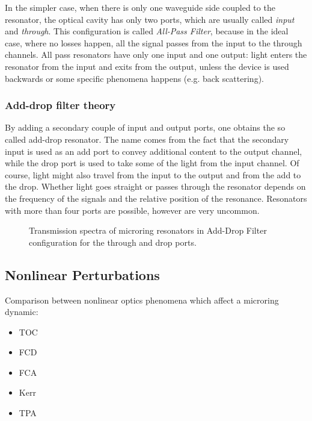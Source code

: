 In the simpler case, when there is only one waveguide side coupled to the resonator, the optical cavity has only two ports, which are usually called \textit{input} and \textit{through}.
This configuration is called \textit{All-Pass Filter}, because in the ideal case, where no losses happen, all the signal passes from the input to the through channels.
All pass resonators have only one input and one output: light enters the resonator from the input and exits from the output, unless the device is used backwards or some specific phenomena happens (e.g. back scattering).

\subsubsection{Add-drop filter theory}
\label{sssec:Add-drop_filter_theory}
By adding a secondary couple of input and output ports, one obtains the so called add-drop resonator.
The name comes from the fact that the secondary input is used as an add port to convey additional content to the output channel, while the drop port is used to take some of the light from the input channel.
Of course, light might also travel from the input to the output and from the add to the drop.
Whether light goes straight or passes through the resonator depends on the frequency of the signals and the relative position of the resonance.
Resonators with more than four ports are possible, however are very uncommon.

\begin{figure}[ht]
	\centering
	
	\caption{Transmission spectra of microring resonators in Add-Drop Filter configuration for the through and drop ports.}
	\label{fig:ADF}
\end{figure}

\subsection{Nonlinear Perturbations}
\label{ssec:Nonlinear_Perturbations}

Comparison between nonlinear optics phenomena which affect a microring dynamic:
\begin{itemize}
\item TOC
\item FCD
\item FCA
\item Kerr
\item TPA
\end{itemize}

